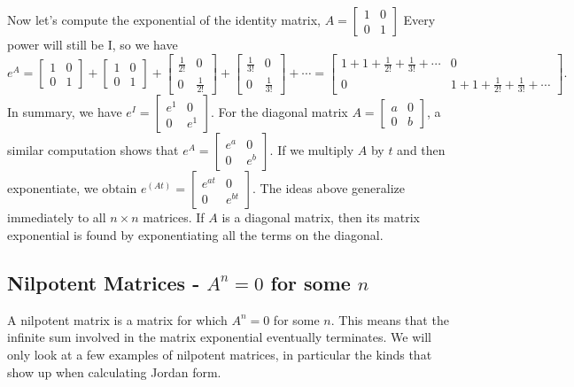 Now let's compute the exponential of the identity matrix, $A=
\begin{bmatrix}
 1 & 0 \\
 0 & 1
\end{bmatrix}
$
Every power will still be I, so we have 
$$e^A = 
\begin{bmatrix}
 1 & 0 \\
 0 & 1
\end{bmatrix}
+
\begin{bmatrix}
 1 & 0 \\
 0 & 1
\end{bmatrix}
+
\begin{bmatrix}
 \frac{1}{2!} & 0 \\
 0 & \frac{1}{2!}
\end{bmatrix}
+
\begin{bmatrix}
 \frac{1}{3!} & 0 \\
 0 & \frac{1}{3!}
\end{bmatrix}
+\cdots = 
\begin{bmatrix}
 1+1+\frac{1}{2!}+\frac{1}{3!}+\cdots & 0 \\
 0 & 1+1+\frac{1}{2!}+\frac{1}{3!}+\cdots
\end{bmatrix}
.$$
In summary, we have $e^I = 
\begin{bmatrix}
 e^1 & 0 \\
 0 & e^1
\end{bmatrix}
$. For the diagonal matrix 
$A=
\begin{bmatrix}
 a & 0 \\
 0 & b
\end{bmatrix}
$, a similar computation shows that $e^{A} = 
\begin{bmatrix}
 e^a & 0 \\
 0 & e^b
\end{bmatrix}
.$  If we multiply $A$ by $t$ and then exponentiate, we obtain 
$e^(At) = 
\begin{bmatrix}
 e^{at} & 0 \\
 0 & e^{bt}
\end{bmatrix}
.$ 
The ideas above generalize immediately to all $n\times n$ matrices. If $A$ is a diagonal matrix, then its matrix exponential is found by exponentiating all the terms on the diagonal.  



\subsection{Nilpotent Matrices - $A^n=0$ for some $n$}
A nilpotent matrix is a matrix for which $A^n=0$ for some $n$. This means that the infinite sum involved in the matrix exponential eventually terminates. We will only look at a few examples of nilpotent matrices, in particular the kinds that show up when calculating Jordan form. 

